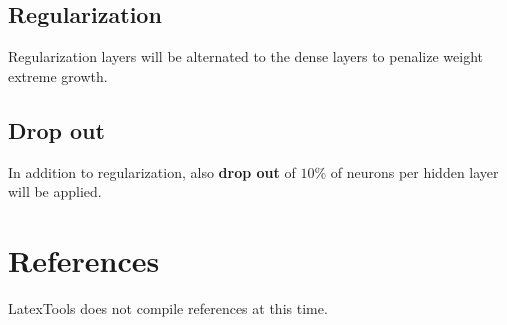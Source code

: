 \section{Regularization}
Regularization layers will be alternated to the dense layers to penalize weight extreme growth.

\section{Drop out}
In addition to regularization, also \textbf{drop out} of \(10\% \) of neurons per hidden layer will be applied.



\chapter{References}
LatexTools does not compile references at this time.

